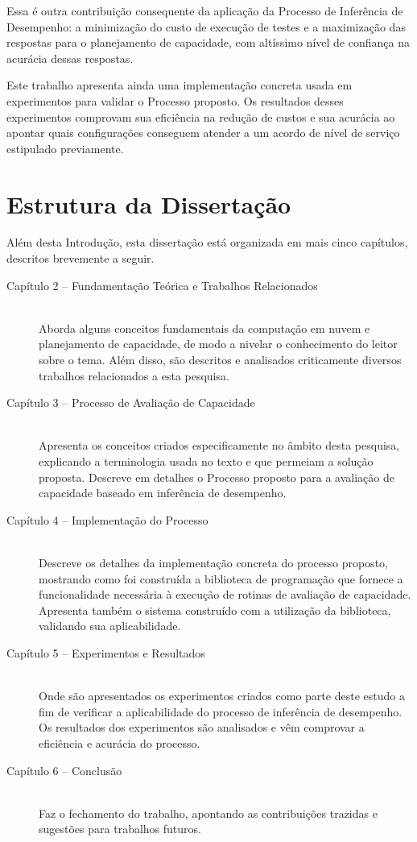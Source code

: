 Essa é outra contribuição consequente da aplicação da Processo de Inferência de
Desempenho: a minimização do custo de execução de testes e a maximização das 
respostas para o planejamento de capacidade, com altíssimo nível de confiança na
acurácia dessas respostas.

Este trabalho apresenta ainda uma implementação concreta usada em experimentos para 
validar o Processo proposto. Os resultados desses experimentos comprovam sua eficiência 
na redução de custos e sua acurácia ao apontar quais configurações conseguem 
atender a um acordo de nível de serviço estipulado previamente. 

\section{Estrutura da Dissertação}
Além desta Introdução, esta dissertação está organizada em mais cinco capítulos, 
descritos brevemente a seguir.

\begin{description}
  \item[Capítulo 2 -- Fundamentação Teórica e Trabalhos Relacionados] \hfill \\
  Aborda alguns conceitos fundamentais da computação em nuvem e planejamento de
  capacidade, de modo a nivelar o conhecimento do leitor sobre o tema. Além disso, 
  são descritos e analisados criticamente diversos trabalhos relacionados a esta pesquisa.
  \item[Capítulo 3 -- Processo de Avaliação de Capacidade] \hfill \\
  Apresenta os conceitos criados especificamente no âmbito desta pesquisa, explicando 
  a terminologia usada no texto e que permeiam a solução proposta. Descreve em 
  detalhes o Processo proposto para a avaliação de capacidade baseado em
  inferência de desempenho.
  \item[Capítulo 4 -- Implementação do Processo] \hfill \\
  Descreve os detalhes da implementação concreta do processo proposto, mostrando
  como foi construída a biblioteca de programação que fornece a funcionalidade
  necessária à execução de rotinas de avaliação de capacidade. Apresenta também
  o sistema construído com a utilização da biblioteca, validando sua 
  aplicabilidade. 
  \item[Capítulo 5 -- Experimentos e Resultados] \hfill \\
  Onde são apresentados os experimentos criados como parte deste estudo a fim de
  verificar a aplicabilidade do processo de inferência de desempenho. Os resultados 
  dos experimentos são analisados e vêm comprovar a eficiência e acurácia do 
  processo. 
  \item[Capítulo 6 -- Conclusão] \hfill \\
  Faz o fechamento do trabalho, apontando as contribuições trazidas e sugestões
  para trabalhos futuros. 
\end{description}
